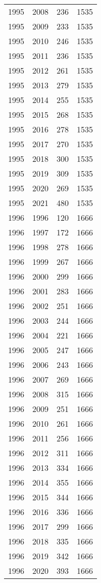 \documentclass[
  11pt,
  letterpaper,
  DIV=11,
  numbers=noendperiod,
  twoside]{scrartcl}
\begin{document}
\begin{longtable}[]{@{}rrrr@{}}
1995 & 2008 & 236 & 1535 \\
1995 & 2009 & 233 & 1535 \\
1995 & 2010 & 246 & 1535 \\
1995 & 2011 & 236 & 1535 \\
1995 & 2012 & 261 & 1535 \\
1995 & 2013 & 279 & 1535 \\
1995 & 2014 & 255 & 1535 \\
1995 & 2015 & 268 & 1535 \\
1995 & 2016 & 278 & 1535 \\
1995 & 2017 & 270 & 1535 \\
1995 & 2018 & 300 & 1535 \\
1995 & 2019 & 309 & 1535 \\
1995 & 2020 & 269 & 1535 \\
1995 & 2021 & 480 & 1535 \\
1996 & 1996 & 120 & 1666 \\
1996 & 1997 & 172 & 1666 \\
1996 & 1998 & 278 & 1666 \\
1996 & 1999 & 267 & 1666 \\
1996 & 2000 & 299 & 1666 \\
1996 & 2001 & 283 & 1666 \\
1996 & 2002 & 251 & 1666 \\
1996 & 2003 & 244 & 1666 \\
1996 & 2004 & 221 & 1666 \\
1996 & 2005 & 247 & 1666 \\
1996 & 2006 & 243 & 1666 \\
1996 & 2007 & 269 & 1666 \\
1996 & 2008 & 315 & 1666 \\
1996 & 2009 & 251 & 1666 \\
1996 & 2010 & 261 & 1666 \\
1996 & 2011 & 256 & 1666 \\
1996 & 2012 & 311 & 1666 \\
1996 & 2013 & 334 & 1666 \\
1996 & 2014 & 355 & 1666 \\
1996 & 2015 & 344 & 1666 \\
1996 & 2016 & 336 & 1666 \\
1996 & 2017 & 299 & 1666 \\
1996 & 2018 & 335 & 1666 \\
1996 & 2019 & 342 & 1666 \\
1996 & 2020 & 393 & 1666 \\

\end{longtable}
\end{document}

